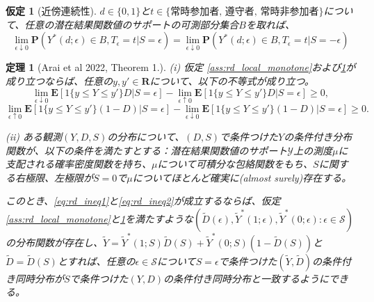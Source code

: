 \documentclass[a4paper]{bxjsarticle}
\newtheorem{theo}{定理}
\newtheorem{ass}{仮定}
\begin{document}
\begin{ass}[近傍連続性] \label{ass:rd_local_continuity}
$d \in \{0,1\}$と$t \in \{\text{常時参加者, 遵守者, 常時非参加者}\}$について、任意の潜在結果関数値のサポートの可測部分集合$B$を取れば、
\[
\lim_{\epsilon \downarrow 0} \mathbf{P}(Y^{\ast} (d;\epsilon) \in B, T_{\epsilon} = t|S = \epsilon) =\lim_{\epsilon \downarrow 0} \mathbf{P}(Y^{\ast} (d;\epsilon) \in B, T_{\epsilon} = t|S = -\epsilon)
\]
\end{ass}

\begin{theo}[Arai et al 2022, Theorem 1.]
(i)
仮定 \ref{ass:rd_local_monotone}および\ref{ass:rd_local_continuity}が成り立つならば、任意の$y, y' \in \mathbf{R}$について、以下の不等式が成り立つ。
\begin{equation}    
 \lim_{\epsilon \downarrow 0} \mathbf{E}[1\{y \leq Y \leq y'\}D|S=\epsilon] - \lim_{\epsilon \uparrow 0} \mathbf{E}[1\{y \leq Y \leq y'\}D|S=\epsilon] \geq 0, \label{eq:rd_ineq1}
\end{equation}
\begin{equation}
 \lim_{\epsilon \uparrow 0} \mathbf{E}[1\{y\leq Y \leq y'\}(1-D)|S=\epsilon] - \lim_{\epsilon \downarrow 0} \mathbf{E}[1\{y \leq Y \leq y'\}(1-D)|S=\epsilon] \geq 0. \label{eq:rd_ineq2}
\end{equation} 

(ii) ある観測$(Y,D,S)$の分布について、$(D,S)$で条件つけた$Y$の条件付き分布関数が、以下の条件を満たすとする：潜在結果関数値のサポート$\mathcal{Y}$上の測度$\mu$に支配される確率密度関数を持ち、$\mu$について可積分な包絡関数をもち、$S$に関する右極限、左極限が$S = 0$で$\mu$についてほとんど確実に(almost surely)存在する。

このとき、\eqref{eq:rd_ineq1}と\eqref{eq:rd_ineq2}が成立するならば、仮定 \ref{ass:rd_local_monotone}と\ref{ass:rd_local_continuity}を満たすような$(\tilde{D}(\epsilon),\tilde{Y}^*(1;\epsilon),\tilde{Y}^*(0;\epsilon): \epsilon \in \mathcal{S})$の分布関数が存在し、$\tilde{Y} = \tilde{Y}^*(1;S) \tilde{D}(S) + \tilde{Y}^*(0;S) (1 - \tilde{D}(S))$と$\tilde{D} = \tilde{D}(S)$とすれば、任意の$\epsilon \in \mathcal{S}$について$S=\epsilon$で条件つけた$(\tilde{Y},\tilde{D})$の条件付き同時分布が$S$で条件つけた$(Y,D)$の条件付き同時分布と一致するようにできる。
\end{theo}
\end{document}
